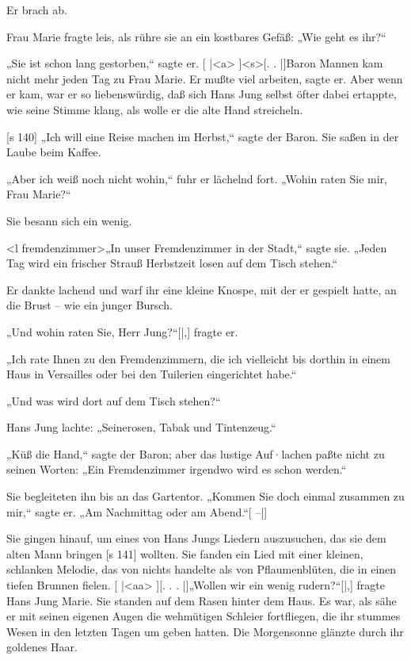 Er brach ab.

Frau Marie fragte leis, als rühre sie an ein
kostbares Gefäß: „Wie geht es ihr?“

„Sie ist schon lang gestorben,“ sagte er.
[
|<a>
]<s>[. . |]Baron Mannen kam nicht mehr jeden Tag
zu Frau Marie. Er mußte viel arbeiten, sagte er.
Aber wenn er kam, war er so liebenswürdig, daß
sich Hans Jung selbst öfter dabei ertappte, wie seine
Stimme klang, als wolle er die alte Hand streicheln.

[s 140]
„Ich will eine Reise machen im Herbst,“ sagte
der Baron. Sie saßen in der Laube beim Kaffee.

„Aber ich weiß noch nicht wohin,“ fuhr er
lächelnd fort. „Wohin raten Sie mir, Frau Marie?“

Sie besann sich ein wenig.

<l fremdenzimmer>„In unser Fremdenzimmer in der Stadt,“ sagte
sie. „Jeden Tag wird ein frischer Strauß Herbstzeit­
losen auf dem Tisch stehen.“

Er dankte lachend und warf ihr eine kleine
Knospe, mit der er gespielt hatte, an die Brust –
wie ein junger Bursch.

„Und wohin raten Sie, Herr Jung?“[|,] fragte er.

„Ich rate Ihnen zu den Fremdenzimmern, die
ich vielleicht bis dorthin in einem Haus in Versailles
oder bei den Tuilerien eingerichtet habe.“

„Und was wird dort auf dem Tisch stehen?“

Hans Jung lachte: „Seinerosen, Tabak und
Tintenzeug.“

„Küß die Hand,“ sagte der Baron; aber das
lustige Auf·lachen paßte nicht zu seinen Worten: „Ein
Fremdenzimmer irgendwo wird es schon werden.“

Sie begleiteten ihn bis an das Gartentor.
„Kommen Sie doch einmal zusammen zu mir,“
sagte er. „Am Nachmittag oder am Abend.“[ –|]

Sie gingen hinauf, um eines von Hans Jungs
Liedern auszusuchen, das sie dem alten Mann bringen
[s 141]
wollten. Sie fanden ein Lied mit einer kleinen,
schlanken Melodie, das von nichts handelte als von
Pflaumenblüten, die in einen tiefen Brunnen fielen.
[
|<aa>
][. . . |]„Wollen wir ein wenig rudern?“[|,] fragte
Hans Jung Marie. Sie standen auf dem Rasen
hinter dem Haus. Es war, als sähe er mit seinen
eigenen Augen die wehmütigen Schleier fortfliegen,
die ihr stummes Wesen in den letzten Tagen um­
geben hatten. Die Morgensonne glänzte durch ihr
goldenes Haar.

